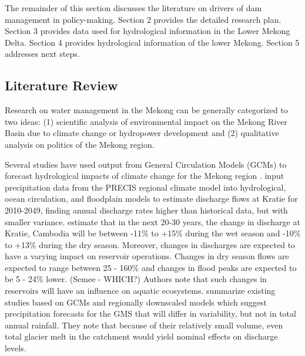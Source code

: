\documentclass[11pt,english]{article}
\theoremstyle{plain} \newtheorem{claim}{Claim}
\theoremstyle{plain} \newtheorem{prop}{Proposition}
\theoremstyle{plain} \newtheorem{hypo}{Hypothesis}
\begin{document}
	The remainder of this section discusses the literature on drivers of dam management in policy-making. Section 2 provides the detailed research plan. Section 3 provides data used for hydrological information in the Lower Mekong Delta. Section 4 provides hydrological information of the lower Mekong. Section 5 addresses next steps. 

\subsection{Literature Review}

Research on water management in the Mekong can be generally categorized to two ideas: (1) scientific analysis of environmental impact on the Mekong River Basin due to climate change or hydropower development and (2) qualitative analysis on politics of the Mekong region. 



Several studies have used output from General Circulation Models (GCMs) to forecast hydrological impacts of climate change for the Mekong region \citep[e.g.][]{Kingston:2011kz}. \citet{Vastila:2010bz} input precipitation data from the PRECIS regional climate model into hydrological, ocean circulation, and floodplain models to estimate discharge flows at Kratie for 2010-2049, finding annual discharge rates higher than historical data, but with smaller variance.  \citet{Lauri2012HESSD} estimate that in the next 20-30 years, the change in discharge at Kratie, Cambodia will be between -11\% to +15\% during the wet season and  -10\% to +13\% during the dry season. Moreover, changes in discharges are expected to have a varying impact on reservoir operations. Changes in dry season flows are expected to range between 25 - 160\% and changes in flood peaks are expected to be 5 - 24\% lower. (Semee - WHICH?) Authors note that such changes in reservoirs will have an influence on aquatic ecosystems.  \citet{Johnston:2010gl} summarize existing studies based on GCMs and regionally downscaled models which suggest precipitation forecasts for the GMS that will differ in variability, but not in total annual rainfall.  They note that because of their relatively small volume, even total glacier melt in the catchment would yield nominal effects on discharge levels.  

\end{document}
